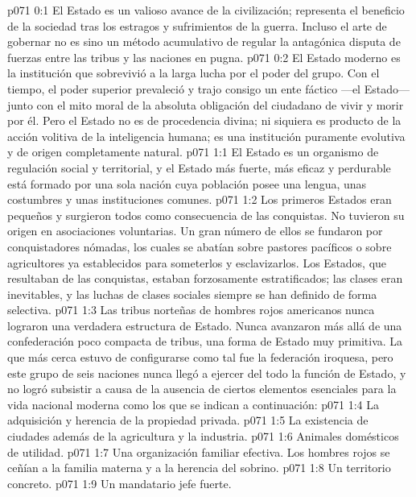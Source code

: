 \author{Melquisedec}
\vs p071 0:1 El Estado es un valioso avance de la civilización; representa el beneficio de la sociedad tras los estragos y sufrimientos de la guerra. Incluso el arte de gobernar no es sino un método acumulativo de regular la antagónica disputa de fuerzas entre las tribus y las naciones en pugna.
\vs p071 0:2 El Estado moderno es la institución que sobrevivió a la larga lucha por el poder del grupo. Con el tiempo, el poder superior prevaleció y trajo consigo un ente fáctico ---el Estado--- junto con el mito moral de la absoluta obligación del ciudadano de vivir y morir por él. Pero el Estado no es de procedencia divina; ni siquiera es producto de la acción volitiva de la inteligencia humana; es una institución puramente evolutiva y de origen completamente natural.
\vs p071 1:1 El Estado es un organismo de regulación social y territorial, y el Estado más fuerte, más eficaz y perdurable está formado por una sola nación cuya población posee una lengua, unas costumbres y unas instituciones comunes.
\vs p071 1:2 Los primeros Estados eran pequeños y surgieron todos como consecuencia de las conquistas. No tuvieron su origen en asociaciones voluntarias. Un gran número de ellos se fundaron por conquistadores nómadas, los cuales se abatían sobre pastores pacíficos o sobre agricultores ya establecidos para someterlos y esclavizarlos. Los Estados, que resultaban de las conquistas, estaban forzosamente estratificados; las clases eran inevitables, y las luchas de clases sociales siempre se han definido de forma selectiva.
\vs p071 1:3 \pc Las tribus norteñas de hombres rojos americanos nunca lograron una verdadera estructura de Estado. Nunca avanzaron más allá de una confederación poco compacta de tribus, una forma de Estado muy primitiva. La que más cerca estuvo de configurarse como tal fue la federación iroquesa, pero este grupo de seis naciones nunca llegó a ejercer del todo la función de Estado, y no logró subsistir a causa de la ausencia de ciertos elementos esenciales para la vida nacional moderna como los que se indican a continuación:
\vs p071 1:4 La adquisición y herencia de la propiedad privada.
\vs p071 1:5 La existencia de ciudades además de la agricultura y la industria.
\vs p071 1:6 Animales domésticos de utilidad.
\vs p071 1:7 Una organización familiar efectiva. Los hombres rojos se ceñían a la familia materna y a la herencia del sobrino.
\vs p071 1:8 Un territorio concreto.
\vs p071 1:9 Un mandatario jefe fuerte.

